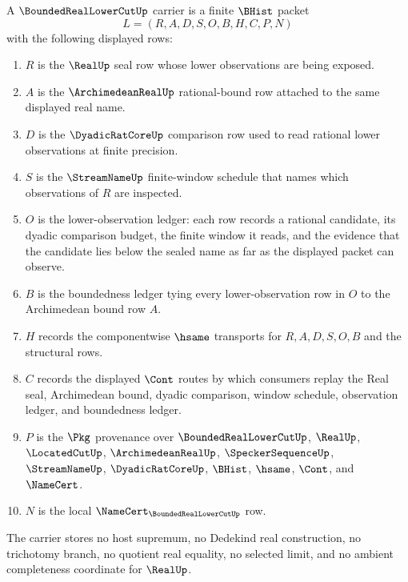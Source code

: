 \begin{definition}
\label{def:bounded-real-lower-cut-carrier}
A $\BoundedRealLowerCutUp$ carrier is a finite $\BHist$ packet
$$
L=(R,A,D,S,O,B,H,C,P,N)
$$
with the following displayed rows:
\begin{enumerate}
\item $R$ is the $\RealUp$ seal row whose lower observations are being exposed.
\item $A$ is the $\ArchimedeanRealUp$ rational-bound row attached to the same displayed real name.
\item $D$ is the $\DyadicRatCoreUp$ comparison row used to read rational lower observations at finite precision.
\item $S$ is the $\StreamNameUp$ finite-window schedule that names which observations of $R$ are inspected.
\item $O$ is the lower-observation ledger: each row records a rational candidate, its dyadic comparison budget, the finite window it reads, and the evidence that the candidate lies below the sealed name as far as the displayed packet can observe.
\item $B$ is the boundedness ledger tying every lower-observation row in $O$ to the Archimedean bound row $A$.
\item $H$ records the componentwise $\hsame$ transports for $R,A,D,S,O,B$ and the structural rows.
\item $C$ records the displayed $\Cont$ routes by which consumers replay the Real seal, Archimedean bound, dyadic comparison, window schedule, observation ledger, and boundedness ledger.
\item $P$ is the $\Pkg$ provenance over $\BoundedRealLowerCutUp$, $\RealUp$, $\LocatedCutUp$, $\ArchimedeanRealUp$, $\SpeckerSequenceUp$, $\StreamNameUp$, $\DyadicRatCoreUp$, $\BHist$, $\hsame$, $\Cont$, and $\NameCert$.
\item $N$ is the local $\NameCert_{\BoundedRealLowerCutUp}$ row.
\end{enumerate}
The carrier stores no host supremum, no Dedekind real construction, no trichotomy branch, no quotient real equality, no selected limit, and no ambient completeness coordinate for $\RealUp$.
\end{definition}

